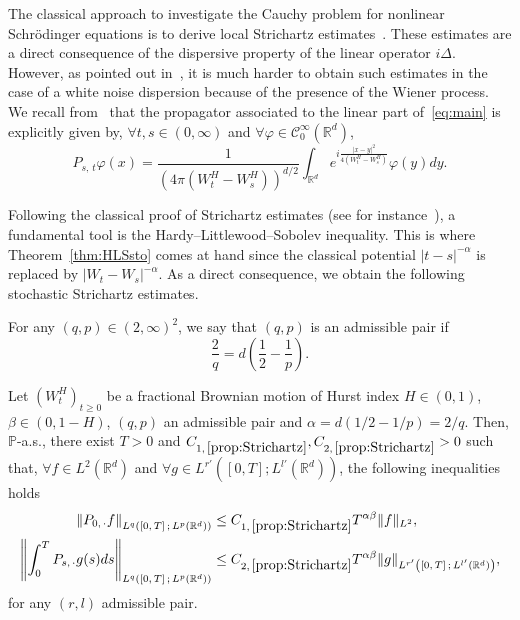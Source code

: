 \documentclass[AHL,Unicode,longabstracts,published]{cedram}
\newcommand{\bbP}{\mathbb{P}}
\newcommand{\bbR}{\mathbb{R}}
\newcommand{\clC}{\mathcal{C}}
\let\oldforall\forall
\renewcommand*{\forall}{\mathrel{\oldforall}}
\begin{document}
The classical approach to investigate the Cauchy problem for nonlinear Schr\"odinger equations is to derive local Strichartz estimates~\cite{cazenave2003semilinear}. These estimates are a direct consequence of the dispersive property of the linear operator $i\Delta$. However, as pointed out in~\cite{debussche20111d}, it is much harder to obtain such estimates in the case of a white noise dispersion because of the presence of the Wiener process. We recall from~\cite{de2010nonlinear,marty2006splitting} that the propagator associated to the linear part of~\eqref{eq:main} is explicitly given by, $\forall t,s\in (0,\infty)$ and $\forall \varphi\in\clC^{\infty}_0(\bbR^d)$,
\begin{equation}\label{eq:propagator}
P_{s,\,t}\varphi(x) = \frac{1}{\left(4\pi\left(W_t^H-W_s^H\right)\right)^{d/2}}\int_{\bbR^d} e^{i\frac{|x-y|^2}{4\left(W_t^H-W_s^H\right)}} \varphi(y)dy.
\end{equation}

Following the classical proof of Strichartz estimates (see for instance~\cite{keel1998endpoint}), a fundamental tool is the Hardy--Littlewood--Sobolev inequality. This is where Theorem~\ref{thm:HLSsto} comes at hand since the classical potential $|t-s|^{-\alpha}$ is replaced by $|W_t-W_s|^{-\alpha}$. As a direct consequence, we obtain the following stochastic Strichartz estimates.

\begin{defi}
For any $(q,p)\in (2,\infty)^2$, we say that $(q,p)$ is an admissible pair if
\[
\frac{2}{q} = d\left(\frac 1 2 - \frac 1 p \right).
\]
\end{defi}

\begin{prop}\label{prop:Strichartz}
Let $(W^H_t)_{t\geq 0}$ be a fractional Brownian motion of Hurst index $H\in (0,1)$, $\beta\in (0,1-H)$, $(q,p)$ an admissible pair and $\alpha = d(1/2-1/p)=2/q$. Then, $\bbP$-a.s., there exist $T>0$ and $C_{1,\,\ref{prop:Strichartz}},C_{2,\,\ref{prop:Strichartz}}>0$ such that, $\forall f\in L^2(\bbR^d)$ and $\forall g\in L^{r'}([0,T];L^{l'}(\bbR^d))$, the following inequalities holds
\begin{align}
\left\|P_{0,\,\cdot} f \right\|_{L^q\left([0,\,T]\,;\,L^p\left(\bbR^d\right)\right)}&\leq C_{1,\,\ref{prop:Strichartz}}T^{\alpha\beta}\|f\|_{L^2}\label{eq:Stri1}
,
\\
\left\|\int_0^T P_{s,\,\cdot}g(s)ds \right\|_{L^q\left([0,\,T]\,;\,L^p\left(\bbR^d\right)\right)} &\leq C_{2,\,\ref{prop:Strichartz}}T^{\alpha\beta} \|g\|_{L^{r'}\left([0,\,T]\,;\,L^{l'}\left(\bbR^d\right)\right)},\label{eq:Stri2}
\end{align}
for any $(r,l)$ admissible pair.
\end{prop}
\end{document}
